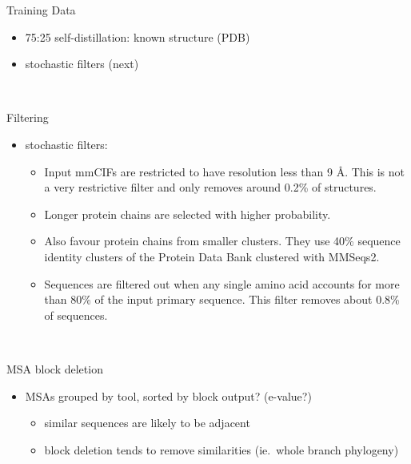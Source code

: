 \documentclass[presentation, smaller]{beamer}
\begin{document}
\begin{frame}[label={sec:orgd977393}]{Training Data}
\begin{itemize}
\item 75:25 self-distillation: known structure (PDB)
\item stochastic filters (next)
\end{itemize}~\cite{jumperHighlyAccurateProtein2021}
\end{frame}


\begin{frame}[label={sec:orga942f37}]{Filtering}
\begin{itemize}
\item stochastic filters:
\begin{itemize}
\item Input mmCIFs are restricted to have resolution less than 9 Å. This is not a very restrictive filter and only removes around 0.2\% of structures.
\item Longer protein chains are selected with higher probability.
\item Also favour protein chains from smaller clusters. They use 40\% sequence identity clusters of the Protein Data Bank clustered with MMSeqs2.
\item Sequences are filtered out when any single amino acid accounts for more than 80\% of the input primary sequence. This filter removes about 0.8\% of sequences.
\end{itemize}
\end{itemize}~\cite{jumperHighlyAccurateProtein2021}
\end{frame}

\begin{frame}[label={sec:org9280f46}]{MSA block deletion}
\begin{itemize}
\item MSAs grouped by tool, sorted by block output? (e-value?)
\begin{itemize}
\item similar sequences are likely to be adjacent
\item block deletion tends to remove similarities (ie.\ whole branch phylogeny)
\end{itemize}
\end{itemize}~\cite{jumperHighlyAccurateProtein2021}
\end{frame}
\end{document}
